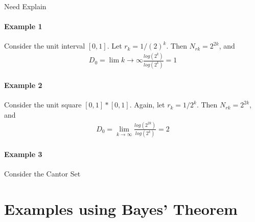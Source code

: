 \documentclass[10 pt,final]{article}
\newcommand{\impo}[1]{{\color{magenta} #1}}
\newcommand{\question}[1]{{\color{blue} #1}}
\begin{document}
\question{Need Explain}

\paragraph{Example 1} Consider the unit interval $[0,1]$. Let $r_k = 1/(2)^k$. Then $N_{rk} = 2^{2k}$, and
\begin{align*}
D_0 = \lim{k \to \infty} \frac{log(2^{k})}{log(2^k)} = 1
\end{align*}

\paragraph{Example 2} Consider the unit square $[0,1]*[0,1]$. Again, let $r_k = 1/2^k$. Then $N_{rk} = 2^{2k}$, and
\begin{align*}
D_0 = \lim_{k \to \infty} \frac{log(2^{2k})}{log(2^k)} = 2
\end{align*}

\paragraph{Example 3} Consider the \impo{Cantor Set} 
\section{Examples using Bayes' Theorem}
\end{document}
